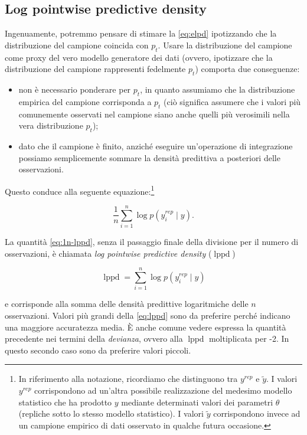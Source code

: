 \documentclass[
  11pt,
]{krantz}
\providecommand{\tightlist}{%
  \setlength{\itemsep}{0pt}\setlength{\parskip}{0pt}}
\DeclareMathOperator{\lppd}{lppd} %
\theoremstyle{definition}
\theoremstyle{definition}
\theoremstyle{definition}
\theoremstyle{definition}
\theoremstyle{remark}
\begin{document}
\hypertarget{log-pointwise-predictive-density}{%
\subsection{Log pointwise predictive density}\label{log-pointwise-predictive-density}}

Ingenuamente, potremmo pensare di stimare la \eqref{eq:elpd} ipotizzando che la distribuzione del campione coincida con \(p_t\). Usare la distribuzione del campione come proxy del vero modello generatore dei dati (ovvero, ipotizzare che la distribuzione del campione rappresenti fedelmente \(p_t\)) comporta due conseguenze:

\begin{itemize}
\tightlist
\item
  non è necessario ponderare per \(p_t\), in quanto assumiamo che la distribuzione empirica del campione corrisponda a \(p_t\) (ciò significa assumere che i valori più comunemente osservati nel campione siano anche quelli più verosimili nella vera distribuzione \(p_t\));
\item
  dato che il campione è finito, anziché eseguire un'operazione di integrazione possiamo semplicemente sommare la densità predittiva a posteriori delle osservazioni.
\end{itemize}

Questo conduce alla seguente equazione:\footnote{In riferimento alla notazione, ricordiamo che \citet{gelman2014understanding} distinguono tra \(y^{rep}\) e \(\tilde{y}\). I valori \(y^{rep}\) corrispondono ad un'altra possibile realizzazione del medesimo modello statistico che ha prodotto \(y\) mediante determinati valori dei parametri \(\theta\) (repliche sotto lo stesso modello statistico). I valori \(\tilde{y}\) corrispondono invece ad un campione empirico di dati osservato in qualche futura occasione.}

\begin{equation}
\frac{1}{n} \sum_{i=1}^n \log p(y_i^{rep} \mid y).
\label{eq:1n-lppd}
\end{equation}

La quantità \eqref{eq:1n-lppd}, senza il passaggio finale della divisione per il numero di osservazioni, è chiamata \emph{log pointwise predictive density} (\(\lppd\))

\begin{equation}
\lppd = \sum_{i=1}^n \log p(y_i^{rep} \mid y)
\label{eq:lppd}
\end{equation}

e corrisponde alla somma delle densità predittive logaritmiche delle \(n\) osservazioni. Valori più grandi della \eqref{eq:lppd} sono da preferire perché indicano una maggiore accuratezza media. È anche comune vedere espressa la quantità precedente nei termini della \emph{devianza}, ovvero alla \(\lppd\) moltiplicata per -2. In questo secondo caso sono da preferire valori piccoli.
\end{document}
